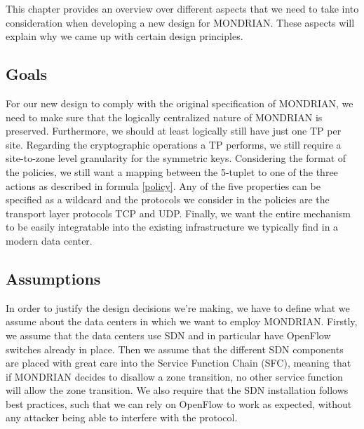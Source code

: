 This chapter provides an overview over different aspects that we need to take into consideration when developing a new design for MONDRIAN. These aspects will explain why we came up with certain design principles.

\subsection{Goals}
For our new design to comply with the original specification of MONDRIAN, we need to make sure that the logically centralized nature of MONDRIAN is preserved. Furthermore, we should at least logically still have just one \acs{TP} per site. Regarding the cryptographic operations a \acs{TP} performs, we still require a site-to-zone level granularity for the symmetric keys. Considering the format of the policies, we still want a mapping between the 5-tuplet to one of the three actions as described in formula \ref{policy}. Any of the five properties can be specified as a wildcard and the protocols we consider in the policies are the transport layer protocols \acs{TCP} and \acs{UDP}. Finally, we want the entire mechanism to be easily integratable into the existing infrastructure we typically find in a modern data center.

\subsection{Assumptions}
In order to justify the design decisions we're making, we have to define what we assume about the data centers in which we want to employ MONDRIAN. Firstly, we assume that the data centers use \acs{SDN} and in particular have OpenFlow switches already in place. Then we assume that the different \acs{SDN} components are placed with great care into the Service Function Chain (\acs{SFC}), meaning that if MONDRIAN decides to disallow a zone transition, no other service function will allow the zone transition. We also require that the \acs{SDN} installation follows best practices, such that we can rely on OpenFlow to work as expected, without any attacker being able to interfere with the protocol.%

